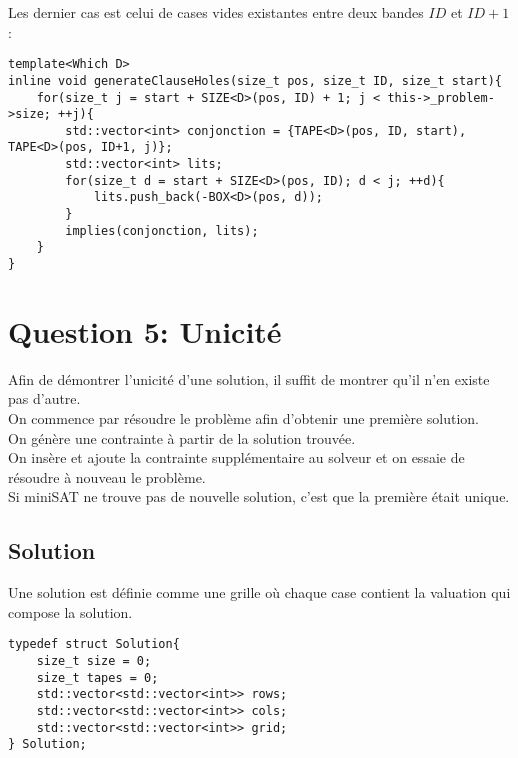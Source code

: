 \documentclass[a4paper,12pt]{report}
\begin{document}
Les dernier cas est celui de cases vides existantes entre deux bandes $ID$ et $ID+1$:
\lstset{style=Cpp, caption=Cases vides entre 2 bandes, label=C:HoleBetween}
\begin{lstlisting}[mathescape=true]
template<Which D>
inline void generateClauseHoles(size_t pos, size_t ID, size_t start){
	for(size_t j = start + SIZE<D>(pos, ID) + 1; j < this->_problem->size; ++j){
		std::vector<int> conjonction = {TAPE<D>(pos, ID, start), TAPE<D>(pos, ID+1, j)};
		std::vector<int> lits;
		for(size_t d = start + SIZE<D>(pos, ID); d < j; ++d){
			lits.push_back(-BOX<D>(pos, d));
		}
		implies(conjonction, lits);
	}
}
\end{lstlisting}

\chapter{Question 5: Unicité}
Afin de démontrer l'unicité d'une solution, il suffit de montrer qu'il n'en existe pas d'autre.\\

On commence par résoudre le problème afin d'obtenir une première solution.\\
On génère une contrainte à partir de la solution trouvée.\\
On insère et ajoute la contrainte supplémentaire au solveur et on essaie de résoudre à nouveau le problème.\\ 

Si miniSAT ne trouve pas de nouvelle solution, c'est que la première était unique.\\

\section{Solution}
Une solution est définie comme une grille où chaque case contient la valuation qui compose la solution.
\lstset{style=Cpp, caption=Solution, label=C:Solution}
\begin{lstlisting}[mathescape=true]
typedef struct Solution{
	size_t size = 0;
	size_t tapes = 0;
	std::vector<std::vector<int>> rows;
	std::vector<std::vector<int>> cols;
	std::vector<std::vector<int>> grid;
} Solution;
\end{lstlisting}
\end{document}
